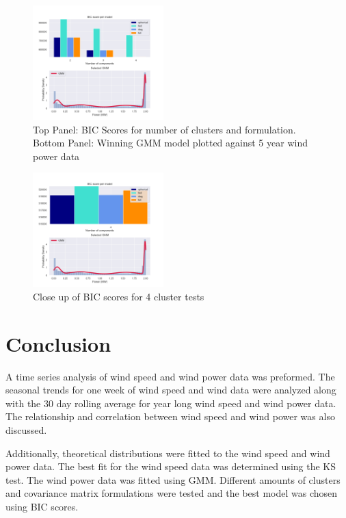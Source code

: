 \documentclass{IEEEtran}
\begin{document}
  \begin{figure}
    \centering
    \includegraphics[width=0.45\textwidth]{figures/GMMdecision}
    \caption{Top Panel: BIC Scores for number of clusters and formulation. Bottom Panel: Winning GMM model plotted against 5 year wind power data}
    \label{fig:GMM1}
  \end{figure}

  \begin{figure}
    \centering
    \includegraphics[width=0.45\textwidth]{figures/GMMdecision2}
    \caption{Close up of BIC scores for 4 cluster tests}
    \label{fig:GMM2}
  \end{figure}

  \newpage

  \section{Conclusion}

  A time series analysis of wind speed and wind power data was preformed. The seasonal trends for one week of wind speed and wind data were analyzed along with the 30 day rolling average for year long wind speed and wind power data. The relationship and correlation between wind speed and wind power was also discussed.

  Additionally, theoretical distributions were fitted to the wind speed and wind power data. The best fit for the wind speed data was determined using the KS test. The wind power data was fitted using GMM. Different amounts of clusters and covariance matrix formulations were tested and the best model was chosen using BIC scores.

  
  
\end{document}
